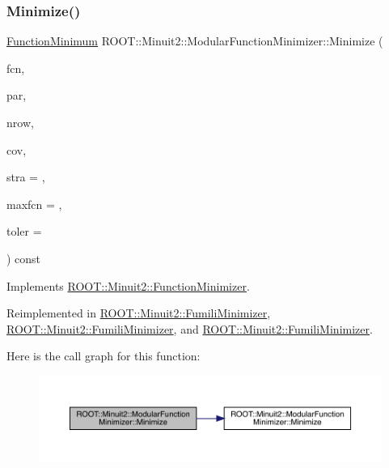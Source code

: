 \subsubsection{\texorpdfstring{Minimize()}{Minimize()}\hspace{0.1cm}{\footnotesize\ttfamily [10/33]}}
{\footnotesize\ttfamily \mbox{\hyperlink{classROOT_1_1Minuit2_1_1FunctionMinimum}{Function\+Minimum}} R\+O\+O\+T\+::\+Minuit2\+::\+Modular\+Function\+Minimizer\+::\+Minimize (\begin{DoxyParamCaption}\item[{const \mbox{\hyperlink{classROOT_1_1Minuit2_1_1FCNGradientBase}{F\+C\+N\+Gradient\+Base}} \&}]{fcn,  }\item[{const std\+::vector$<$ double $>$ \&}]{par,  }\item[{unsigned int}]{nrow,  }\item[{const std\+::vector$<$ double $>$ \&}]{cov,  }\item[{unsigned int}]{stra = {},  }\item[{unsigned int}]{maxfcn = {},  }\item[{double}]{toler = {} }\end{DoxyParamCaption}) const\hspace{0.3cm}{\ttfamily [virtual]}}



Implements \mbox{\hyperlink{classROOT_1_1Minuit2_1_1FunctionMinimizer_a467a9dd60665c9b31969fe55d73b6401}{R\+O\+O\+T\+::\+Minuit2\+::\+Function\+Minimizer}}.



Reimplemented in \mbox{\hyperlink{classROOT_1_1Minuit2_1_1FumiliMinimizer_aa17be65e26311aa25f6fd3680f747958}{R\+O\+O\+T\+::\+Minuit2\+::\+Fumili\+Minimizer}}, \mbox{\hyperlink{classROOT_1_1Minuit2_1_1FumiliMinimizer_aa17be65e26311aa25f6fd3680f747958}{R\+O\+O\+T\+::\+Minuit2\+::\+Fumili\+Minimizer}}, and \mbox{\hyperlink{classROOT_1_1Minuit2_1_1FumiliMinimizer_aa17be65e26311aa25f6fd3680f747958}{R\+O\+O\+T\+::\+Minuit2\+::\+Fumili\+Minimizer}}.

Here is the call graph for this function\+:
\nopagebreak
\begin{figure}[H]
\begin{center}
\leavevmode
\includegraphics[width=350pt]{d3/dc8/classROOT_1_1Minuit2_1_1ModularFunctionMinimizer_a1cab3c0cc40932cb9287232fe9cf7437_cgraph}
\end{center}
\end{figure}
\mbox{\label{classROOT_1_1Minuit2_1_1ModularFunctionMinimizer_a97334cf66537c195aa8d6df14e745bef}} 
